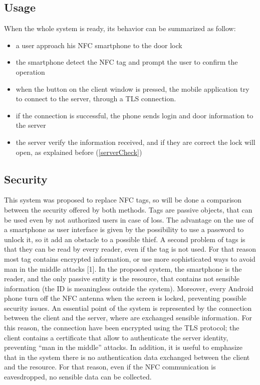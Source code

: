 \documentclass[conference]{IEEEtran}
\begin{document}
\subsection{Usage}

When the whole system is ready, its behavior can be summarized as follow:
\begin{itemize}
 \item a user approach his NFC smartphone to the door lock
 \item the smartphone detect the NFC tag and prompt the user to confirm the operation
 \item when the button on the client window is pressed, the mobile application try to connect to the server, through a TLS connection.
 \item if the connection is successful, the phone sends login and door information to the server
 \item the server verify the information received, and if they are correct the lock will open,  as explained before (\ref{serverCheck})
\end{itemize}

\subsection{Security}

This system was proposed to replace NFC tags, so will be done a comparison between the security offered by both methods.
Tags are passive objects, that can be used even by not authorized users in case of loss. The advantage on the use of a smartphone as user interface is given by the possibility to use a password to unlock it, so it add an obstacle to a possible thief.
A second problem of tags is that they can be read by every reader, even if the tag is not used. For that reason most tag contains encrypted information, or use more sophisticated ways to avoid man in the middle attacks [1].
In the proposed system, the smartphone is the reader, and the only passive entity is the resource, that contains not sensible information (the ID is meaningless outside the system). Moreover, every Android phone turn off the NFC antenna when the screen is locked, preventing possible security issues.
An essential point of the system is represented by the connection between the client and the server, where are exchanged sensible information. For this reason, the connection have been encrypted using the TLS protocol; the client contains a certificate that allow to authenticate the server identity, preventing ``man in the middle'' attacks.
In addition, it is useful to emphasize that in the system there is no authentication data exchanged between the client and the resource. For that reason, even if the NFC communication is eavesdropped, no sensible data can be collected.
\end{document}
